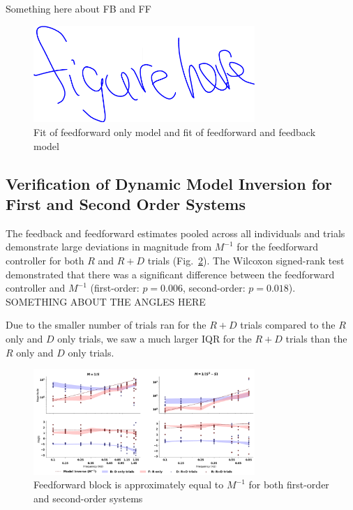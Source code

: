 \documentclass{ifacconf}
\begin{document}
Something here about FB and FF 

\begin{figure}[h]
\begin{center}
\includegraphics[width=8.4cm]{Capture.png}    %
\caption{Fit of feedforward only model and fit of feedforward and feedback model} 
\label{fig:FBvsFF}
\end{center}
\end{figure}

\subsection{Verification of Dynamic Model Inversion for First and Second Order Systems}

The feedback and feedforward estimates pooled across all individuals and trials demonstrate large deviations in magnitude from $M^{-1}$ for the feedforward controller for both $R$ and $R+D$ trials (Fig.~\ref{fig:ffMinv}). The Wilcoxon signed-rank test demonstrated that there was a significant difference between the feedforward controller and $M^{-1}$ (first-order: $p=0.006$, second-order: $p=0.018$). SOMETHING ABOUT THE ANGLES HERE 

Due to the smaller number of trials ran for the $R+D$ trials compared to the $R$ only and $D$ only trials, we saw a much larger IQR for the $R+D$ trials than the $R$ only and $D$ only trials.

\begin{figure}[h]
\begin{center}
\includegraphics[width=8.4cm]{ffMinv.png}    %
\caption{Feedforward block is approximately equal to $M^{-1}$ for both first-order and second-order systems} 
\label{fig:ffMinv}
\end{center}
\end{figure}
\end{document}
